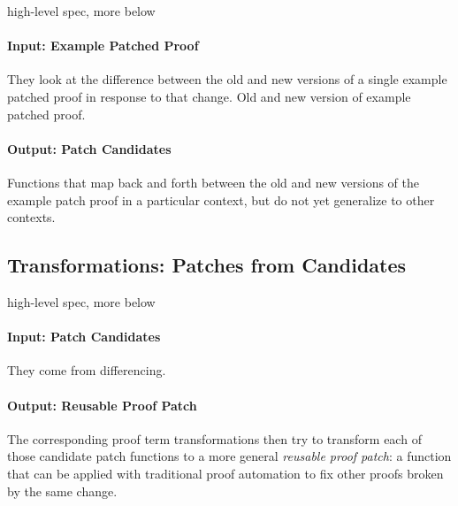high-level spec, more below

\paragraph{Input: Example Patched Proof}
They look at the difference between the old and new versions of a single example patched proof in response to that change.
Old and new version of example patched proof.

\paragraph{Output: Patch Candidates}
Functions that map back and forth between the old and new versions
of the example patch proof in a particular context, but do not yet generalize to other contexts.

\subsection{Transformations: Patches from Candidates}

high-level spec, more below

\paragraph{Input: Patch Candidates}
They come from differencing.

\paragraph{Output: Reusable Proof Patch}
The corresponding proof term transformations then try to transform each of those candidate patch functions to a more general \textit{reusable proof patch}:
a function that can be applied with traditional proof automation to fix other proofs broken by the same change.

